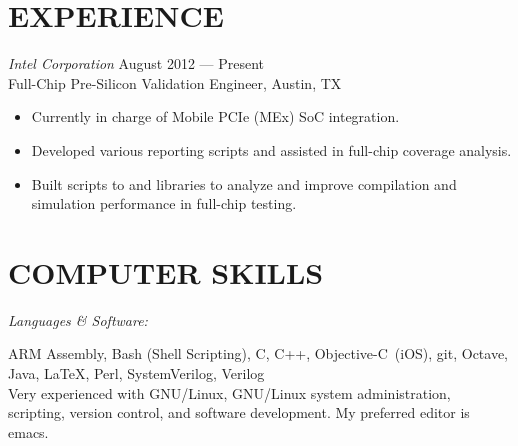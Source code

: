 \documentclass[margin]{res}
\begin{document}
\begin{resume}
  \section{EXPERIENCE} {\sl Intel Corporation} 
  \hfill August 2012 --- Present \\
  Full-Chip Pre-Silicon Validation Engineer, Austin, TX
  \vspace{0.25em}
  \begin{itemize}
  \item Currently in charge of Mobile PCIe (MEx) SoC integration.
  \item Developed various reporting scripts and assisted in full-chip
    coverage analysis.
  \item Built scripts to and libraries to analyze and improve
    compilation and simulation performance in full-chip testing.
  \end{itemize}

  \section{COMPUTER SKILLS} 
  {\sl Languages \& Software:} \\
  \vspace{-1.0em}
  \begin{adjustwidth}{1.5em}{0pt}
    ARM Assembly, Bash (Shell Scripting), C, C++, \mbox{Objective-C
      (iOS)}, git, Octave, Java, \LaTeX, Perl, SystemVerilog, Verilog
    \vspace{0.5em}\\
    Very experienced with GNU/Linux, GNU/Linux system administration,
    scripting, version control, and software development. My preferred
    editor is emacs.
  \end{adjustwidth}


\end{resume}
\end{document}
